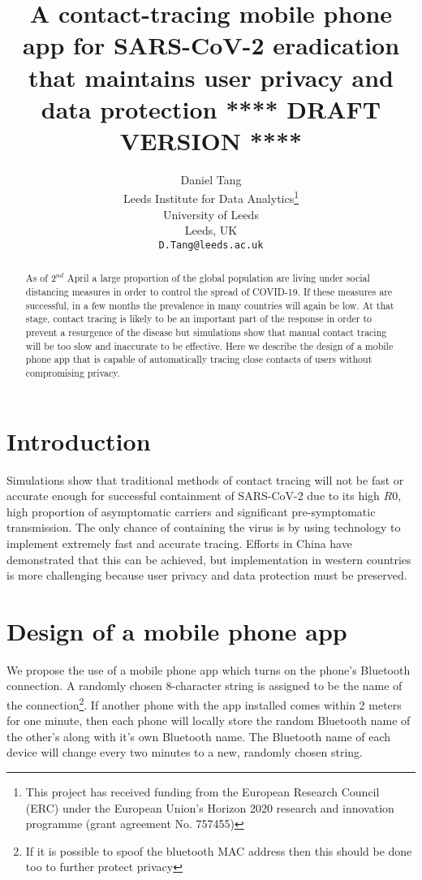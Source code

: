 \documentclass{article}
\title{A contact-tracing mobile phone app for SARS-CoV-2 eradication that maintains user privacy and data protection
\textbf{**** DRAFT VERSION ****}
}
\author{
  Daniel Tang\\
  Leeds Institute for Data Analytics\thanks{This project has received funding from the European Research Council (ERC) under the European Union’s Horizon 2020 research and innovation programme (grant agreement No. 757455)}\\
  University of Leeds\\
  Leeds, UK\\
  \texttt{D.Tang@leeds.ac.uk} \\
}
\begin{document}
\maketitle

\begin{abstract}
As of $2^{nd}$ April a large proportion of the global population are living under social distancing measures in order to control the spread of COVID-19. If these measures are successful, in a few months the prevalence in many countries will again be low. At that stage, contact tracing is likely to be an important part of the response in order to prevent a resurgence of the disease but simulations show\cite{tang2020Contact} that manual contact tracing will be too slow and inaccurate to be effective. Here we describe the design of a mobile phone app that is capable of automatically tracing close contacts of users without compromising privacy.
\end{abstract}


\section{Introduction}

Simulations show\cite{tang2020Contact} that traditional methods of contact tracing will not be fast or accurate enough for successful containment of SARS-CoV-2 due to its high $R0$, high proportion of asymptomatic carriers and significant pre-symptomatic transmission. The only chance of containing the virus is by using technology to implement extremely fast and accurate tracing. Efforts in China have demonstrated that this can be achieved, but implementation in western countries is more challenging because user privacy and data protection must be preserved.

\section{Design of a mobile phone app}

We propose the use of a mobile phone app which turns on the phone's Bluetooth connection. A randomly chosen 8-character string is assigned to be the name of the connection\footnote{If it is possible to spoof the bluetooth MAC address then this should be done too to further protect privacy}. If another phone with the app installed comes within 2 meters for one minute, then each phone will locally store the random Bluetooth name of the other's along with it's own Bluetooth name. The Bluetooth name of each device will change every two minutes to a new, randomly chosen string.
\end{document}
